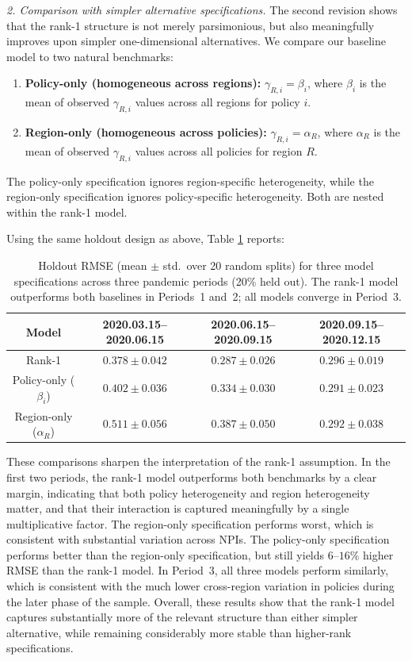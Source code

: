 \documentclass[letterpaper,twoside,11pt]{reviewresponse}
\begin{document}
 \textit{2. Comparison with simpler alternative specifications.}  
 The second revision shows that the rank-1 structure is not merely parsimonious, but also meaningfully improves upon simpler one-dimensional alternatives. We compare our baseline model to two natural benchmarks:
 \begin{enumerate}
 	\item \textbf{Policy-only (homogeneous across regions):} $\gamma_{R,i} = \beta_i$, where $\beta_i$ is the mean of observed $\gamma_{R,i}$ values across all regions for policy $i$.
 	\item \textbf{Region-only (homogeneous across policies):} $\gamma_{R,i} = \alpha_R$, where $\alpha_R$ is the mean of observed $\gamma_{R,i}$ values across all policies for region $R$.
 \end{enumerate}
 The policy-only specification ignores region-specific heterogeneity, while the region-only specification ignores policy-specific heterogeneity. Both are nested within the rank-1 model.
 
 Using the same holdout design as above, Table \ref{tab:alt_specs_1} reports:
 \begin{table}[h!]
 	\centering
 	\begin{tabular}{|c|c|c|c|}
 		\hline Model & 2020.03.15--2020.06.15 & 2020.06.15--2020.09.15 & 2020.09.15--2020.12.15\\\hline
 		Rank-1 & $\mathbf{0.378} \pm 0.042$ & $\mathbf{0.287} \pm 0.026$ & $0.296 \pm 0.019$ \\
 		Policy-only ($\beta_i$) & $0.402 \pm 0.036$ & $0.334 \pm 0.030$ & $0.291 \pm 0.023$ \\
 		Region-only ($\alpha_R$) & $0.511 \pm 0.056$ & $0.387 \pm 0.050$ & $0.292 \pm 0.038$ \\\hline
 	\end{tabular}
 	\caption{Holdout RMSE (mean $\pm$ std.\ over 20 random splits) for three model specifications across three pandemic periods (20\% held out). The rank-1 model outperforms both baselines in Periods~1 and~2; all models converge in Period~3.}
 	\label{tab:alt_specs_1}
 \end{table}
 
 These comparisons sharpen the interpretation of the rank-1 assumption. In the first two periods, the rank-1 model outperforms both benchmarks by a clear margin, indicating that both policy heterogeneity and region heterogeneity matter, and that their interaction is captured meaningfully by a single multiplicative factor. The region-only specification performs worst, which is consistent with substantial variation across NPIs. The policy-only specification performs better than the region-only specification, but still yields $6$--$16\%$ higher RMSE than the rank-1 model. In Period~3, all three models perform similarly, which is consistent with the much lower cross-region variation in policies during the later phase of the sample. Overall, these results show that the rank-1 model captures substantially more of the relevant structure than either simpler alternative, while remaining considerably more stable than higher-rank specifications.
 
\end{document}
